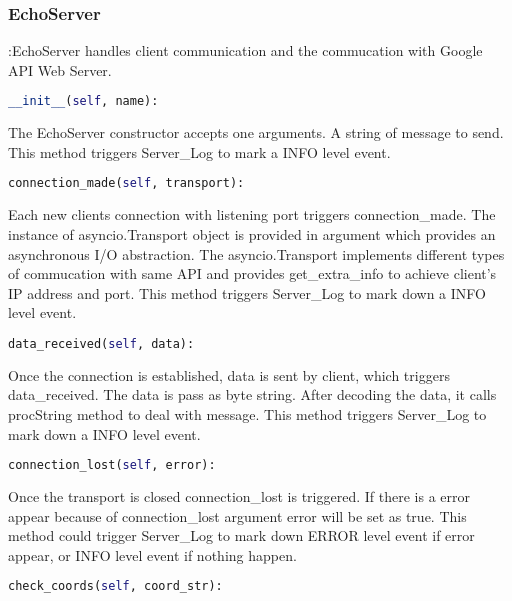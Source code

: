 \documentclass[10pt, a4paper]{IEEEtran}
\begin{document}
    \subsubsection{EchoServer}:EchoServer handles client communication and the commucation with Google API Web Server.\\
    \begin{lstlisting}[language=python, frame=single, basicstyle=\footnotesize] 
         __init__(self, name):
    \end{lstlisting}
    The EchoServer constructor accepts one arguments. A string of message to send. This method triggers Server\_Log to mark a INFO level event.\\
    \begin{lstlisting}[language=python, frame=single, basicstyle=\footnotesize] 
        connection_made(self, transport):
    \end{lstlisting}
    Each new clients connection with listening port triggers connection\_made. The instance of asyncio.Transport object is provided in argument which provides an asynchronous I/O abstraction. The asyncio.Transport implements different types of commucation with same API and provides get\_extra\_info to achieve client's IP address and port. This method triggers Server\_Log to mark down a INFO level event.\\
    \begin{lstlisting}[language=python, frame=single, basicstyle=\footnotesize] 
        data_received(self, data):
    \end{lstlisting}
    Once the connection is established, data is sent by client, which triggers data\_received. The data is pass as byte string. After decoding the data, it calls procString method to deal with message. This method triggers Server\_Log to mark down a INFO level event.\\
    \begin{lstlisting}[language=python, frame=single, basicstyle=\footnotesize] 
        connection_lost(self, error):
    \end{lstlisting}
    Once the transport is closed connection\_lost is triggered. If there is a error appear because of connection\_lost argument error will be set as true. This method could trigger Server\_Log to mark down ERROR level event if error appear, or INFO level event if nothing happen.\\
    \begin{lstlisting}[language=python, frame=single, basicstyle=\footnotesize] 
        check_coords(self, coord_str):
    \end{lstlisting}
\end{document}
